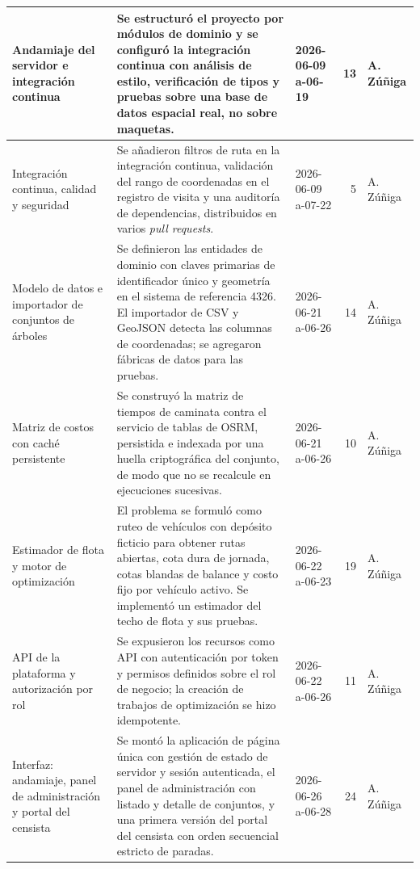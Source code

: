 \begin{xltabular}{\linewidth}{|p{3cm}|X|p{3cm}|r|l|}
\hline
Andamiaje del servidor e integración continua & Se estructuró el proyecto por módulos de dominio y se configuró la integración continua con análisis de estilo, verificación de tipos y pruebas sobre una base de datos espacial real, no sobre maquetas. & 2026-06-09 a-06-19 & 13 & A. Zúñiga \\
\hline
Integración continua, calidad y seguridad & Se añadieron filtros de ruta en la integración continua, validación del rango de coordenadas en el registro de visita y una auditoría de dependencias, distribuidos en varios \textit{pull requests}. & 2026-06-09 a-07-22 & 5 & A. Zúñiga \\
\hline
Modelo de datos e importador de conjuntos de árboles & Se definieron las entidades de dominio con claves primarias de identificador único y geometría en el sistema de referencia 4326. El importador de CSV y GeoJSON detecta las columnas de coordenadas; se agregaron fábricas de datos para las pruebas. & 2026-06-21 a-06-26 & 14 & A. Zúñiga \\
\hline
Matriz de costos con caché persistente & Se construyó la matriz de tiempos de caminata contra el servicio de tablas de OSRM, persistida e indexada por una huella criptográfica del conjunto, de modo que no se recalcule en ejecuciones sucesivas. & 2026-06-21 a-06-26 & 10 & A. Zúñiga \\
\hline
Estimador de flota y motor de optimización & El problema se formuló como ruteo de vehículos con depósito ficticio para obtener rutas abiertas, cota dura de jornada, cotas blandas de balance y costo fijo por vehículo activo. Se implementó un estimador del techo de flota y sus pruebas. & 2026-06-22 a-06-23 & 19 & A. Zúñiga \\
\hline
API de la plataforma y autorización por rol & Se expusieron los recursos como API con autenticación por token y permisos definidos sobre el rol de negocio; la creación de trabajos de optimización se hizo idempotente. & 2026-06-22 a-06-26 & 11 & A. Zúñiga \\
\hline
Interfaz: andamiaje, panel de administración y portal del censista & Se montó la aplicación de página única con gestión de estado de servidor y sesión autenticada, el panel de administración con listado y detalle de conjuntos, y una primera versión del portal del censista con orden secuencial estricto de paradas. & 2026-06-26 a-06-28 & 24 & A. Zúñiga \\

\end{xltabular}

